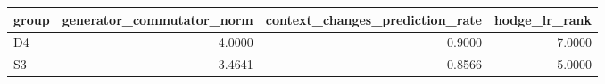 \begin{tabular}{lrrr}
\toprule
group & generator_commutator_norm & context_changes_prediction_rate & hodge_lr_rank \\
\midrule
D4 & 4.0000 & 0.9000 & 7.0000 \\
S3 & 3.4641 & 0.8566 & 5.0000 \\
\bottomrule
\end{tabular}
